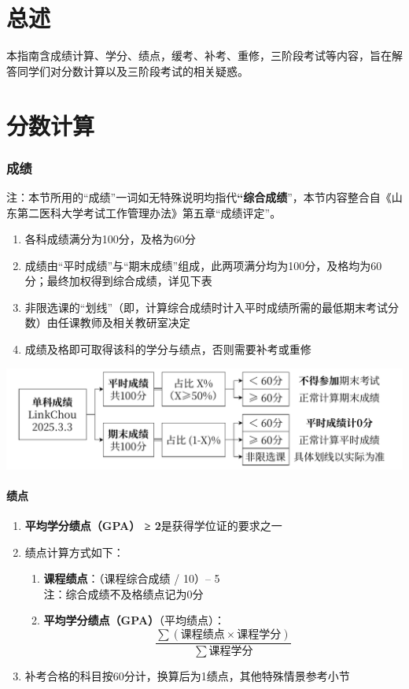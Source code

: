 \part[总述]{总述}
本指南含成绩计算、学分、绩点，缓考、补考、重修，三阶段考试等内容，旨在解答同学们对分数计算以及三阶段考试的相关疑惑。

\part[分数计算]{分数计算}

\section[成绩]{成绩}
注：本节所用的“成绩”一词如无特殊说明均指代\textbf{“综合成绩}”，本节内容整合自《山东第二医科大学考试工作管理办法》第五章“成绩评定”。
\begin{enumerate}
    \item 各科成绩满分为100分，及格为60分
    \item 成绩由“平时成绩”与“期末成绩”组成，此两项满分均为100分，及格均为60分；最终加权得到综合成绩，详见下表
    \item 非限选课的“划线”（即，计算综合成绩时计入平时成绩所需的最低期末考试分数）由任课教师及相关教研室决定
    \item 成绩及格即可取得该科的学分与绩点，否则需要补考或重修
\end{enumerate}

\begin{table}[H]
    \centering
    \includegraphics[width=\textwidth]{单科成绩计算.pdf}
    \label{score}
\end{table}

\subsection[绩点]{绩点}
\label{gpa} %
\begin{enumerate}
    \item \textbf{平均学分绩点（GPA） ≥ 2}是获得学位证的要求之一
    \item 绩点计算方式如下：
          \begin{enumerate}
              \item \textbf{课程绩点}：（课程综合成绩 / 10）-- 5\\
                    注：综合成绩不及格绩点记为0分
              \item \textbf{平均学分绩点（GPA）}（平均绩点）：
              $$\frac{\sum (课程绩点 \times 课程学分)}{\sum 课程学分}$$
          \end{enumerate}
    \item 补考合格的科目按60分计，换算后为1绩点，其他特殊情景参考小节
\end{enumerate}

